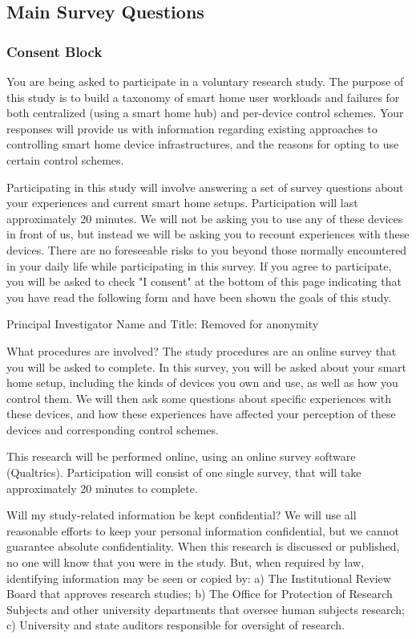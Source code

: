 \subsection{Main Survey Questions}
\label{appdx:survey}

\subsubsection{Consent Block}
\label{appdx:survey:consent}

\printQcounter{} You are being asked to participate in a voluntary research study. The purpose of this study is to build a taxonomy of smart home user workloads and failures for both centralized (using a smart home hub) and per-device control schemes. Your responses will provide us with information regarding existing approaches to controlling smart home device infrastructures, and the reasons for opting to use certain control schemes.

Participating in this study will involve answering a set of survey questions about your experiences and current smart home setups. Participation will last approximately 20 minutes. We will not be asking you to use any of these devices in front of us, but instead we will be asking you to recount experiences with these devices. There are no foreseeable risks to you beyond those normally encountered in your daily life while participating in this survey. If you agree to participate, you will be asked to check "I consent" at the bottom of this page indicating that you have read the following form and have been shown the goals of this study.

Principal Investigator Name and Title: Removed for anonymity

What procedures are involved?
The study procedures are an online survey that you will be asked to complete. In this survey, you will be asked about your smart home setup, including the kinds of devices you own and use, as well as how you control them. We will then ask some questions about specific experiences with these devices, and how these experiences have affected your perception of these devices and corresponding control schemes.

This research will be performed online, using an online survey software (Qualtrics). Participation will consist of one single survey, that will take approximately 20 minutes to complete.

Will my study-related information be kept confidential?
We will use all reasonable efforts to keep your personal information confidential, but we cannot guarantee absolute confidentiality. When this research is discussed or published, no one will know that you were in the study. But, when required by law, identifying information may be seen or copied by: a) The Institutional Review Board that approves research studies; b) The Office for Protection of Research Subjects and other university departments that oversee human subjects research; c) University and state auditors responsible for oversight of research.

